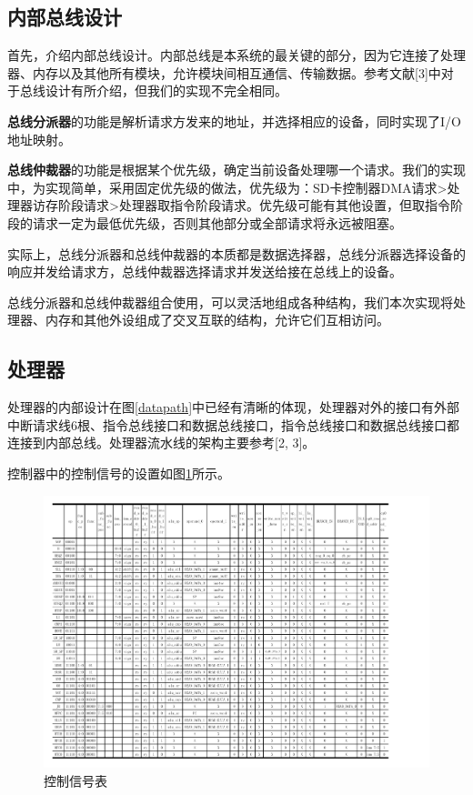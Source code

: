 \documentclass[11pt,utf8]{report}
\begin{document}
\subsection{内部总线设计}
	\par 首先，介绍内部总线设计。内部总线是本系统的最关键的部分，因为它连接了处理器、内存以及其他所有模块，允许模块间相互通信、传输数据。参考文献[3]中对于总线设计有所介绍，但我们的实现不完全相同。
	\par \textbf{总线分派器}的功能是解析请求方发来的地址，并选择相应的设备，同时实现了I/O地址映射。
	\par \textbf{总线仲裁器}的功能是根据某个优先级，确定当前设备处理哪一个请求。我们的实现中，为实现简单，采用固定优先级的做法，优先级为：SD卡控制器DMA请求>处理器访存阶段请求>处理器取指令阶段请求。优先级可能有其他设置，但取指令阶段的请求一定为最低优先级，否则其他部分或全部请求将永远被阻塞。
	\par 实际上，总线分派器和总线仲裁器的本质都是数据选择器，总线分派器选择设备的响应并发给请求方，总线仲裁器选择请求并发送给接在总线上的设备。
	\par 总线分派器和总线仲裁器组合使用，可以灵活地组成各种结构，我们本次实现将处理器、内存和其他外设组成了交叉互联的结构，允许它们互相访问。

\subsection{处理器}
	\par 处理器的内部设计在图\ref{datapath}中已经有清晰的体现，处理器对外的接口有外部中断请求线6根、指令总线接口和数据总线接口，指令总线接口和数据总线接口都连接到内部总线。处理器流水线的架构主要参考[2, 3]。
	
	\par 控制器中的控制信号的设置如图\ref{control}所示。	
	
	\begin{center}
	\begin{figure}[h]
			\centering
			\setlength{\leftskip}{-40pt}
			\includegraphics[width=1.2\textwidth]{control.pdf}
			\caption{控制信号表}
			\label{control}
		\end{figure}
	\end{center}
\end{document}
